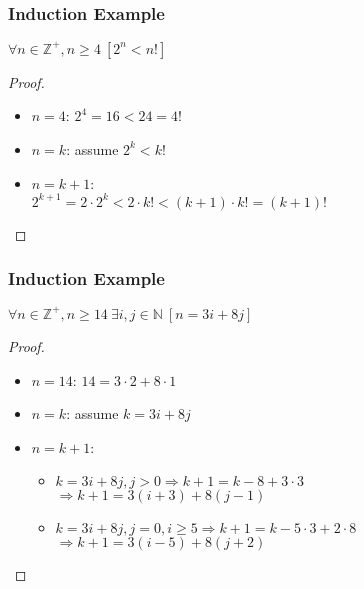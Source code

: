 \documentclass[dvipsnames]{beamer}
\begin{document}
\begin{frame}
  \frametitle{Induction Example}

  \begin{theorem}
    $\forall n \in \mathbb{Z}^+, n \geq 4~[2^n < n!]$
  \end{theorem}

  \pause
  \begin{proof}
    \begin{itemize}
      \item $n=4$: $2^4=16<24=4!$

      \pause
      \item $n=k$: assume $2^k < k!$

      \pause
      \item $n=k+1$:\\
        $2^{k+1} = 2 \cdot 2^k < 2 \cdot k! < (k+1) \cdot k! = (k+1)!$
    \end{itemize}
  \end{proof}
\end{frame}

\begin{frame}
  \frametitle{Induction Example}

  \begin{theorem}
    $\forall n \in \mathbb{Z}^+, n \geq 14~\exists i,j \in \mathbb{N}~[n=3i+8j]$
  \end{theorem}

  \pause
  \begin{proof}
    \begin{itemize}
      \item $n=14$: $14=3 \cdot 2 + 8 \cdot 1$

      \pause
      \item $n=k$: assume $k=3i+8j$

      \pause
      \item $n=k+1$:
      \begin{itemize}
        \item $k=3i+8j, j>0 \Rightarrow k+1=k-8+3 \cdot 3$\\
          $\Rightarrow k+1=3(i+3)+8(j-1)$
        \item $k=3i+8j, j=0, i \geq 5 \Rightarrow k+1=k-5 \cdot 3+2 \cdot 8$\\
          $\Rightarrow k+1=3(i-5)+8(j+2)$
      \end{itemize}
    \end{itemize}
  \end{proof}
\end{frame}
\end{document}
